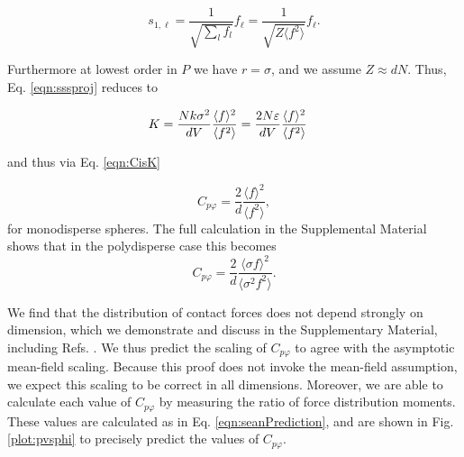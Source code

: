 \begin{equation}
s_{1,\ell}= \frac{1}{\sqrt{\sum_l f_l }} f_{\ell} = \frac{1}{\sqrt{Z \langle f^2 \rangle}} f_{\ell}. \label{eqn:sss}
\end{equation}

Furthermore at lowest order in $P$ we have $r = \sigma$, and we assume $Z \approx d N$. Thus, Eq.  \ref{eqn:sssproj} reduces to 

\begin{align}
    K&= \frac{N k \sigma^2}{ d V} \frac{\langle  f \rangle^2}{\langle f^2 \rangle} = \frac{2 N \varepsilon}{ d V} \frac{\langle  f \rangle^2}{\langle f^2 \rangle}
\end{align}


and thus via Eq. \ref{eqn:CisK}
 
\begin{equation}
    C_{p\varphi} = \frac{2}{d} \frac{\langle f \rangle^2}{\langle f^2 \rangle},
\end{equation}
for monodisperse spheres. The full calculation in the Supplemental Material shows that in the polydisperse case this becomes
\begin{equation}
    C_{p\varphi} = \frac{2}{d} \frac{\langle \sigma f \rangle^2}{\langle \sigma^2 f^2 \rangle}.\label{eqn:seanPrediction}
\end{equation}

We find that the distribution of contact forces does not depend strongly on dimension, which we demonstrate and discuss in the Supplementary Material, including Refs. \cite{charbonneau_jamming_2015,mueth_force_1998}. We thus predict the scaling of $C_{p \varphi}$ to agree with the asymptotic mean-field scaling. Because this proof does not invoke the mean-field assumption, we expect this scaling to be correct in all dimensions. Moreover, we are able to calculate each value of $C_{p\varphi}$ by measuring the ratio of force distribution moments. These values are calculated as in Eq. \ref{eqn:seanPrediction}, and are shown in Fig. \ref{plot:pvsphi} to precisely predict the values of $C_{p\varphi}$. 

